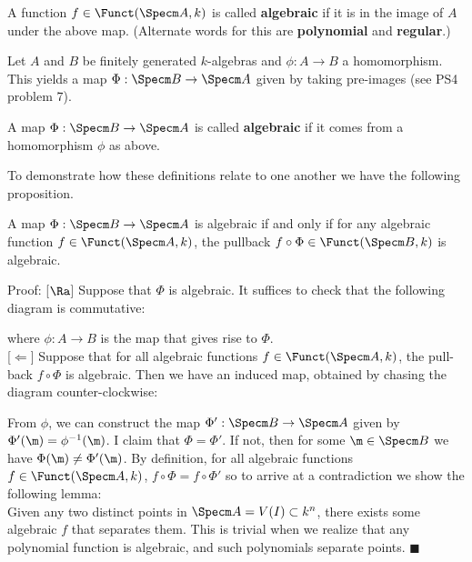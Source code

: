 \documentclass[10 pt]{article}
\newtheorem{cor}{Corollary}[section]
\newtheorem{lem}{Lemma}[section]
\newtheorem{prop}{Proposition}[section]
\newtheorem{propconstr}{Proposition-Construction}[section]
\newcommand\begin{lemma}{\begin{lem}}
\newcommand\begin{proposition}{\begin{prop}}
\newcommand\begin{proof}{\begin{proof}}
\newcommand\begin{corollary}{\begin{cor}}
\newcommand\begin{proposition}constr{\begin{propconstr}}
\newcommand\end{definition}{\end{defn}}
\newcommand\end{lemma}{\end{lem}}
\newcommand\end{corollary}{\end{cor}}
\newcommand\end{proposition}{\end{prop}}
\newcommand\end{proof}{\end{proof}}
\newcommand\end{proposition}constr{\end{propconstr}}
\begin{document}
\begin{definition} A function $f\in \Funct(\Specm A,k)$ is called {\bf algebraic} if it is in the image of $A$ under the above map.  (Alternate words for this are {\bf polynomial} and {\bf regular}.) \end{definition}

Let $A$ and $B$ be finitely generated $k$-algebras and $\phi:A\rightarrow B$ a homomorphism.  This yields a map $\Phi:\Specm B\rightarrow \Specm A$ given by taking pre-images (see PS4 problem 7).

\begin{definition} A map $\Phi:\Specm B\rightarrow \Specm A$ is called {\bf algebraic} if it comes from a homomorphism $\phi$ as above.\end{definition}

To demonstrate how these definitions relate to one another we have the following proposition.

\begin{proposition} A map $\Phi:\Specm B\rightarrow \Specm A$ is algebraic if and only if for any algebraic function $f\in \Funct(\Specm A,k)$, the pullback $f\circ \Phi\in \Funct(\Specm B,k)$ is algebraic.\end{proposition}

Proof:  [$\Ra$] Suppose that $\Phi$ is algebraic.  It suffices to check that the following diagram is commutative:\\


where $\phi:A\rightarrow B$ is the map that gives rise to $\Phi$.\\

[$\Leftarrow$] Suppose that for all algebraic functions $f\in \Funct(\Specm A,k)$, the pull-back $f\circ\Phi$ is algebraic.  Then we have an induced map, obtained by chasing the diagram counter-clockwise:


From $\phi$, we can construct the map $\Phi':\Specm B \rightarrow \Specm A$ given by $\Phi'(\m)=\phi^{-1}(\m)$.  I claim that $\Phi=\Phi'$.  If not, then for some $\m\in \Specm B$ we have $\Phi(\m)\neq \Phi'(\m)$.  By definition, for all algebraic functions $f\in \Funct(\Specm A,k)$, $f\circ\Phi=f\circ\Phi'$ so to arrive at a contradiction we show the following lemma:\\
Given any two distinct points in $\Specm A=V(I)\subset k^n$, there exists some algebraic $f$ that separates them.  This is trivial when we realize that any polynomial function is algebraic, and such polynomials separate points.  $\blacksquare$
\end{document}
